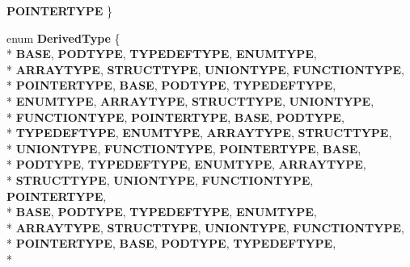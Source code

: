 \begin{DoxyCompactItemize}
{\bfseries P\-O\-I\-N\-T\-E\-R\-T\-Y\-P\-E}
 \}
\item 
enum {\bfseries Derived\-Type} \{ \\*
{\bfseries B\-A\-S\-E}, 
{\bfseries P\-O\-D\-T\-Y\-P\-E}, 
{\bfseries T\-Y\-P\-E\-D\-E\-F\-T\-Y\-P\-E}, 
{\bfseries E\-N\-U\-M\-T\-Y\-P\-E}, 
\\*
{\bfseries A\-R\-R\-A\-Y\-T\-Y\-P\-E}, 
{\bfseries S\-T\-R\-U\-C\-T\-T\-Y\-P\-E}, 
{\bfseries U\-N\-I\-O\-N\-T\-Y\-P\-E}, 
{\bfseries F\-U\-N\-C\-T\-I\-O\-N\-T\-Y\-P\-E}, 
\\*
{\bfseries P\-O\-I\-N\-T\-E\-R\-T\-Y\-P\-E}, 
{\bfseries B\-A\-S\-E}, 
{\bfseries P\-O\-D\-T\-Y\-P\-E}, 
{\bfseries T\-Y\-P\-E\-D\-E\-F\-T\-Y\-P\-E}, 
\\*
{\bfseries E\-N\-U\-M\-T\-Y\-P\-E}, 
{\bfseries A\-R\-R\-A\-Y\-T\-Y\-P\-E}, 
{\bfseries S\-T\-R\-U\-C\-T\-T\-Y\-P\-E}, 
{\bfseries U\-N\-I\-O\-N\-T\-Y\-P\-E}, 
\\*
{\bfseries F\-U\-N\-C\-T\-I\-O\-N\-T\-Y\-P\-E}, 
{\bfseries P\-O\-I\-N\-T\-E\-R\-T\-Y\-P\-E}, 
{\bfseries B\-A\-S\-E}, 
{\bfseries P\-O\-D\-T\-Y\-P\-E}, 
\\*
{\bfseries T\-Y\-P\-E\-D\-E\-F\-T\-Y\-P\-E}, 
{\bfseries E\-N\-U\-M\-T\-Y\-P\-E}, 
{\bfseries A\-R\-R\-A\-Y\-T\-Y\-P\-E}, 
{\bfseries S\-T\-R\-U\-C\-T\-T\-Y\-P\-E}, 
\\*
{\bfseries U\-N\-I\-O\-N\-T\-Y\-P\-E}, 
{\bfseries F\-U\-N\-C\-T\-I\-O\-N\-T\-Y\-P\-E}, 
{\bfseries P\-O\-I\-N\-T\-E\-R\-T\-Y\-P\-E}, 
{\bfseries B\-A\-S\-E}, 
\\*
{\bfseries P\-O\-D\-T\-Y\-P\-E}, 
{\bfseries T\-Y\-P\-E\-D\-E\-F\-T\-Y\-P\-E}, 
{\bfseries E\-N\-U\-M\-T\-Y\-P\-E}, 
{\bfseries A\-R\-R\-A\-Y\-T\-Y\-P\-E}, 
\\*
{\bfseries S\-T\-R\-U\-C\-T\-T\-Y\-P\-E}, 
{\bfseries U\-N\-I\-O\-N\-T\-Y\-P\-E}, 
{\bfseries F\-U\-N\-C\-T\-I\-O\-N\-T\-Y\-P\-E}, 
{\bfseries P\-O\-I\-N\-T\-E\-R\-T\-Y\-P\-E}, 
\\*
{\bfseries B\-A\-S\-E}, 
{\bfseries P\-O\-D\-T\-Y\-P\-E}, 
{\bfseries T\-Y\-P\-E\-D\-E\-F\-T\-Y\-P\-E}, 
{\bfseries E\-N\-U\-M\-T\-Y\-P\-E}, 
\\*
{\bfseries A\-R\-R\-A\-Y\-T\-Y\-P\-E}, 
{\bfseries S\-T\-R\-U\-C\-T\-T\-Y\-P\-E}, 
{\bfseries U\-N\-I\-O\-N\-T\-Y\-P\-E}, 
{\bfseries F\-U\-N\-C\-T\-I\-O\-N\-T\-Y\-P\-E}, 
\\*
{\bfseries P\-O\-I\-N\-T\-E\-R\-T\-Y\-P\-E}, 
{\bfseries B\-A\-S\-E}, 
{\bfseries P\-O\-D\-T\-Y\-P\-E}, 
{\bfseries T\-Y\-P\-E\-D\-E\-F\-T\-Y\-P\-E}, 
\\*

\end{DoxyCompactItemize}
